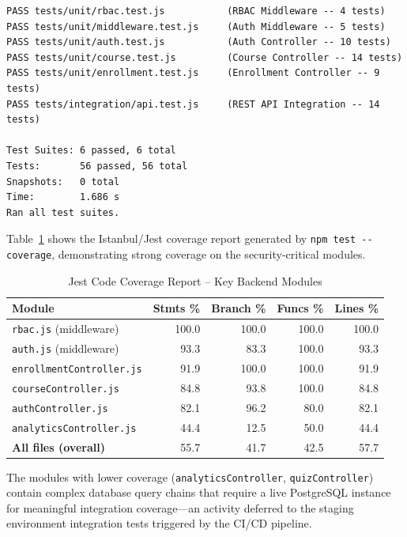 \documentclass[12pt, a4paper]{report}
\begin{document}
\begin{lstlisting}[style=output_style, caption={Full test suite execution: 56 tests across 6 suites (actual output)}]
PASS tests/unit/rbac.test.js           (RBAC Middleware -- 4 tests)
PASS tests/unit/middleware.test.js     (Auth Middleware -- 5 tests)
PASS tests/unit/auth.test.js           (Auth Controller -- 10 tests)
PASS tests/unit/course.test.js         (Course Controller -- 14 tests)
PASS tests/unit/enrollment.test.js     (Enrollment Controller -- 9 tests)
PASS tests/integration/api.test.js     (REST API Integration -- 14 tests)

Test Suites: 6 passed, 6 total
Tests:       56 passed, 56 total
Snapshots:   0 total
Time:        1.686 s
Ran all test suites.
\end{lstlisting}

Table~\ref{tab:coverage} shows the Istanbul/Jest coverage report generated by \texttt{npm test -{}-coverage}, demonstrating strong coverage on the security-critical modules.

\begin{table}[H]
\centering
\caption{Jest Code Coverage Report -- Key Backend Modules}
\label{tab:coverage}
\begin{tabular}{lrrrr}
\toprule
\textbf{Module} & \textbf{Stmts \%} & \textbf{Branch \%} & \textbf{Funcs \%} & \textbf{Lines \%} \\
\midrule
\texttt{rbac.js} (middleware)        & 100.0 & 100.0 & 100.0 & 100.0 \\
\texttt{auth.js} (middleware)        &  93.3 &  83.3 & 100.0 &  93.3 \\
\texttt{enrollmentController.js}     &  91.9 & 100.0 & 100.0 &  91.9 \\
\texttt{courseController.js}         &  84.8 &  93.8 & 100.0 &  84.8 \\
\texttt{authController.js}           &  82.1 &  96.2 &  80.0 &  82.1 \\
\texttt{analyticsController.js}      &  44.4 &  12.5 &  50.0 &  44.4 \\
\midrule
\textbf{All files (overall)}         &  55.7 &  41.7 &  42.5 &  57.7 \\
\bottomrule
\end{tabular}
\end{table}

The modules with lower coverage (\texttt{analyticsController}, \texttt{quizController}) contain complex database query chains that require a live PostgreSQL instance for meaningful integration coverage---an activity deferred to the staging environment integration tests triggered by the CI/CD pipeline.
\end{document}
